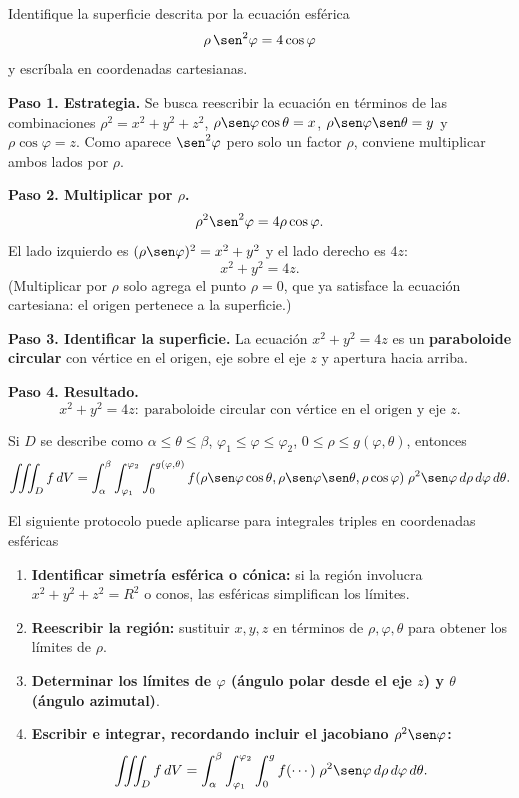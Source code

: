 \begin{prob}
Identifique la superficie descrita por la ecuación esférica
\[
\rho\,\sen^2\varphi = 4\cos\varphi
\]
y escríbala en coordenadas cartesianas.
\begin{myproof}
\textbf{Paso 1. Estrategia.}
Se busca reescribir la ecuación en términos de las combinaciones $\rho^2=x^2+y^2+z^2$, $\rho\sen\varphi\cos\theta=x$, $\rho\sen\varphi\sen\theta=y$ y $\rho\cos\varphi=z$. Como aparece $\sen^2\varphi$ pero solo un factor $\rho$, conviene multiplicar ambos lados por $\rho$.

\textbf{Paso 2. Multiplicar por $\rho$.}
\[
\rho^2\sen^2\varphi = 4\rho\cos\varphi.
\]
El lado izquierdo es $(\rho\sen\varphi)^2 = x^2+y^2$ y el lado derecho es $4z$:
\[
x^2+y^2 = 4z.
\]
(Multiplicar por $\rho$ solo agrega el punto $\rho=0$, que ya satisface la ecuación cartesiana: el origen pertenece a la superficie.)

\textbf{Paso 3. Identificar la superficie.}
La ecuación $x^2+y^2=4z$ es un \textbf{paraboloide circular} con vértice en el origen, eje sobre el eje $z$ y apertura hacia arriba.

\textbf{Paso 4. Resultado.}
\[
\boxed{x^2+y^2=4z:\ \text{paraboloide circular con vértice en el origen y eje }z.}
\]
\end{myproof}
\end{prob}

\begin{theorem}
Si $D$ se describe como $\alpha\le\theta\le\beta$, $\varphi_1\le\varphi\le\varphi_2$, $0\le\rho\le g(\varphi,\theta)$, entonces
\[
\iiint_D f\,dV
= \int_{\alpha}^{\beta}\int_{\varphi_1}^{\varphi_2}\int_{0}^{g(\varphi,\theta)}
  f(\rho\sen\varphi\cos\theta,\rho\sen\varphi\sen\theta,\rho\cos\varphi)\;
  \rho^2\sen\varphi\,d\rho\,d\varphi\,d\theta.
\]
\end{theorem}



\begin{pasos} El siguiente protocolo puede aplicarse para integrales triples en coordenadas esféricas
\begin{enumerate}
    \item \textbf{Identificar simetría esférica o cónica:} si la región involucra $x^2+y^2+z^2=R^2$ o conos, las esféricas simplifican los límites.
    \item \textbf{Reescribir la región:} sustituir $x,y,z$ en términos de $\rho,\varphi,\theta$ para obtener los límites de $\rho$.
    \item \textbf{Determinar los límites de $\varphi$ (ángulo polar desde el eje $z$) y $\theta$ (ángulo azimutal)}.
    \item \textbf{Escribir e integrar, recordando incluir el jacobiano $\rho^2\sen\varphi$:}
    \[
    \iiint_D f\,dV = \int_{\alpha}^{\beta}\int_{\varphi_1}^{\varphi_2}\int_{0}^{g}
    f(\cdots)\;\rho^2\sen\varphi\,d\rho\,d\varphi\,d\theta.
    \]
\end{enumerate}
\end{pasos}

